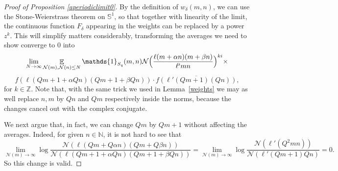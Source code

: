 \documentclass[11pt]{amsart}
\newtheorem{proposition}[lemma]{Proposition}
\theoremstyle{definition}
\DeclareMathOperator*{\E}{\mathbb{E}}
\newcommand{\N}{{\mathbb N}}
\newcommand{\NN}{{\mathcal N}}
\renewcommand{\S}{\mathbb{S}}
\newcommand{\Z}{{\mathbb Z}}
\newcommand{\U}{{\mathbb U}}
\newcommand{\WS}[1]{{\color{blue}{{#1}}}}
\begin{document}

\begin{proof}[Proof of Proposition \ref{aperiodiclimit0}]
By the definition of $w_{\delta}(m,n)$, we can use the Stone-Weierstrass theorem on $\S^1$, so that together with linearity of the limit, the continuous function $F_{\delta}$ appearing in the weights can be replaced by a power $z^k$. This will simplify matters considerably, transforming the averages we need to show converge to $0$ into 
\[
\lim_{N \to \infty} \E_{\NN(m), \NN(n) \leq N} \mathds{1}_{S_q}(m,n)\NN\Bigl(\frac{\ell(m+\alpha n)(m+\beta n)}{\ell' mn}\Bigr)^{ki}  \times\]
\[
f(\ell(Qm+1+\alpha Qn)(Qm+1+\beta Qn))\cdot \overline{f(\ell'(Qm+1)(Qn))},
\]
for $k \in \Z$. Note that, with the same trick we used in Lemma~\ref{weights} we may as well replace $n, m$ by $Qn$ and $Qm$ respectively inside the norms, because the changes cancel out with the complex conjugate.

We next argue that, in fact, we can change $Qm$ by $Qm+1$ without affecting the averages. Indeed, for given $n \in \N$, it is not hard to see that 
$$\lim_{\NN(m) \to \infty} \log \frac{\NN(\ell(Qm+Q\alpha n)(Qm+Q\beta n))}{\NN(\ell(Qm+1+\alpha Qn)(Qm+1+\beta Qn))}=\lim_{\NN(m) \to \infty} \log \frac{\NN(\ell'(Q^2mn))}{\NN(\ell'(Qm+1)Qn)}=0.$$ So this change is valid. 


\end{proof}
\end{document}
